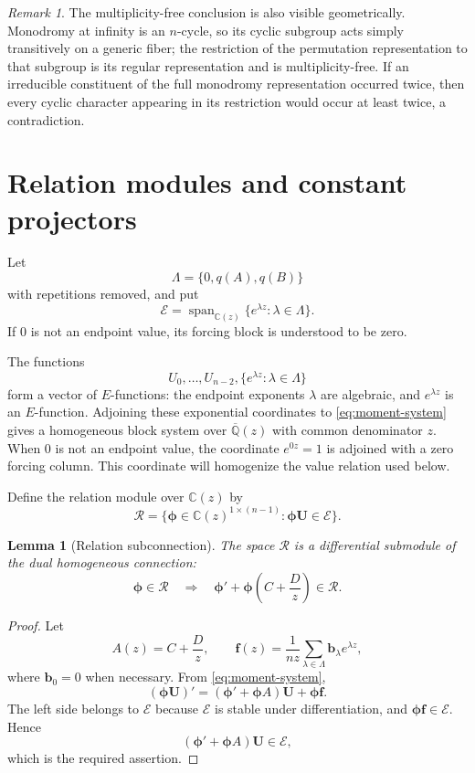 \documentclass[11pt]{article}
\numberwithin{equation}{section}
\newtheorem{lemma}[lemma]{Lemma}
\theoremstyle{definition}
\theoremstyle{remark}
\newtheorem{remark}[remark]{Remark}
\newcommand{\C}{\mathbb C}
\newcommand{\Qbar}{\overline{\mathbb Q}}
\newcommand{\Span}{\operatorname{span}}
\newcommand{\Ecal}{\mathcal E}
\newcommand{\Rcal}{\mathcal R}
\begin{document}
\begin{remark}
The multiplicity-free conclusion is also visible geometrically.  Monodromy
at infinity is an $n$-cycle, so its cyclic subgroup acts simply transitively
on a generic fiber; the restriction of the permutation representation to
that subgroup is its regular representation and is multiplicity-free.  If an
irreducible constituent of the full monodromy representation occurred twice,
then every cyclic character appearing in its restriction would occur at least
twice, a contradiction.
\end{remark}

\section{Relation modules and constant projectors}\label{sec:exp-relations}

Let
\[
  \Lambda=\{0,q(A),q(B)\}
\]
with repetitions removed, and put
\begin{equation}\label{eq:E-space}
  \Ecal=
  \Span_{\C(z)}\{e^{\lambda z}:\lambda\in\Lambda\}.
\end{equation}
If $0$ is not an endpoint value, its forcing block is understood to be zero.

The functions
\[
  U_0,\ldots,U_{n-2},
  \{e^{\lambda z}:\lambda\in\Lambda\}
\]
form a vector of $E$-functions: the endpoint exponents $\lambda$ are
algebraic, and $e^{\lambda z}$ is an $E$-function.  Adjoining these exponential
coordinates to \eqref{eq:moment-system} gives a homogeneous block system over
$\Qbar(z)$ with common denominator $z$.  When $0$ is not an endpoint value,
the coordinate $e^{0z}=1$ is adjoined with a zero forcing column.  This
coordinate will homogenize the value relation used below.

Define the relation module over $\C(z)$ by
\begin{equation}\label{eq:relation-module}
  \Rcal=
  \{\boldsymbol\phi\in\C(z)^{1\times(n-1)}:
  \boldsymbol\phi\mathbf U\in\Ecal\}.
\end{equation}

\begin{lemma}[Relation subconnection]\label{lem:relation-subconnection}
The space $\Rcal$ is a differential submodule of the dual homogeneous connection:
\[
  \boldsymbol\phi\in\Rcal
  \quad\Longrightarrow\quad
  \boldsymbol\phi'
  +\boldsymbol\phi\left(C+\frac Dz\right)
  \in\Rcal.
\]
\end{lemma}

\begin{proof}
Let
\[
  A(z)=C+\frac Dz,
  \qquad
  \mathbf f(z)=\frac1{nz}\sum_{\lambda\in\Lambda}
  \mathbf b_\lambda e^{\lambda z},
\]
where $\mathbf b_0=0$ when necessary.  From \eqref{eq:moment-system},
\[
  \left(\boldsymbol\phi\mathbf U\right)'
  =\left(\boldsymbol\phi'+\boldsymbol\phi A\right)\mathbf U
   +\boldsymbol\phi\mathbf f.
\]
The left side belongs to $\Ecal$ because $\Ecal$ is stable under differentiation, and $\boldsymbol\phi\mathbf f\in\Ecal$.  Hence
\[
  \left(\boldsymbol\phi'+\boldsymbol\phi A\right)\mathbf U\in\Ecal,
\]
which is the required assertion.
\end{proof}
\end{document}
